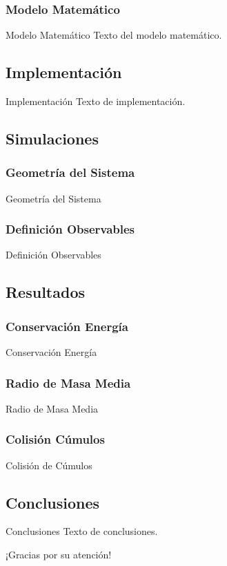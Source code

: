 \documentclass{beamer}
\begin{document}
  \subsubsection{Modelo Matemático}
  \begin{frame}{Modelo Matemático}
    Texto del modelo matemático.
  \end{frame}

  \subsection{Implementación}
  \begin{frame}{Implementación}
    Texto de implementación.
  \end{frame}

  \subsection{Simulaciones}
  \subsubsection{Geometría del Sistema}
  \begin{frame}{Geometría del Sistema}

  \end{frame}
  \subsubsection{Definición Observables}
  \begin{frame}{Definición Observables}

  \end{frame}

  \subsection{Resultados}
  \subsubsection{Conservación Energía}
  \begin{frame}{Conservación Energía}

  \end{frame}
  \subsubsection{Radio de Masa Media}
  \begin{frame}{Radio de Masa Media}

  \end{frame}
  \subsubsection{Colisión Cúmulos}
  \begin{frame}{Colisión de Cúmulos}

  \end{frame}

  \subsection{Conclusiones}
  \begin{frame}{Conclusiones}
    Texto de conclusiones.
  \end{frame}

  \begin{frame}{}
    \centering
    \Huge ¡Gracias por su atención!
  \end{frame}
\end{document}
